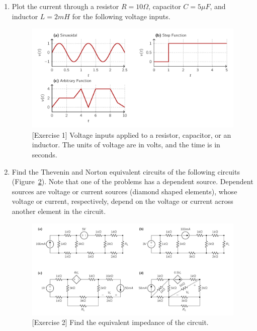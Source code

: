 \begin{enumerate}
    \item Plot the current through a resistor $R = 10\Omega$, capacitor $C = 5\mu F$, and inductor $L = 2mH$ for the following voltage inputs.
    \begin{figure}[h]
        \centering
        \includegraphics[width=\textwidth]{figure/ch02/ex02-01.pdf}
        \caption{[Exercise 1] Voltage inputs applied to a resistor, capacitor, or an inductor. The units of voltage are in volts, and the time is in seconds.}
        \label{fig:ex02-01}
    \end{figure}
    
    \item Find the Thevenin and Norton equivalent circuits of the following circuits (Figure~\ref{fig:ex02-02}). Note that one of the problems has a dependent source. Dependent sources are voltage or current sources (diamond shaped elements), whose voltage or current, respectively, depend on the voltage or current across another element in the circuit.
    \begin{figure}[h]
        \centering
        \includegraphics[width=\textwidth]{figure/ch02/ex02-02.pdf}
        \caption{[Exercise 2] Find the equivalent impedance of the circuit.}
        \label{fig:ex02-02}
    \end{figure}
    

\end{enumerate}
